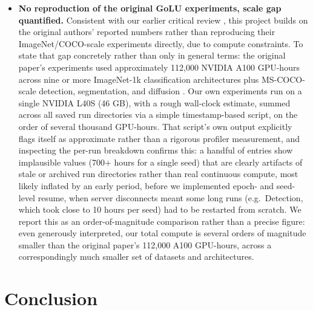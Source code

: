 \documentclass[conference]{IEEEtran}
\begin{document}
\begin{itemize}
\item \textbf{No reproduction of the original GoLU experiments, scale gap quantified.} Consistent with our earlier critical review \cite{kopic2026critical}, this project builds on the original authors' reported numbers rather than reproducing their ImageNet/COCO-scale experiments directly, due to compute constraints. To state that gap concretely rather than only in general terms: the original paper's experiments used approximately 112{,}000 NVIDIA A100 GPU-hours across nine or more ImageNet-1k classification architectures plus MS-COCO-scale detection, segmentation, and diffusion \cite{golu2025}. Our own experiments run on a single NVIDIA L40S (46 GB), with a rough wall-clock estimate, summed across all saved run directories via a simple timestamp-based script, on the order of several thousand GPU-hours. That script's own output explicitly flags itself as approximate rather than a rigorous profiler measurement, and inspecting the per-run breakdown confirms this: a handful of entries show implausible values (700+ hours for a single seed) that are clearly artifacts of stale or archived run directories rather than real continuous compute, most likely inflated by an early period, before we implemented epoch- and seed-level resume, when server disconnects meant some long runs (e.g.\ Detection, which took close to 10 hours per seed) had to be restarted from scratch. We report this as an order-of-magnitude comparison rather than a precise figure: even generously interpreted, our total compute is several orders of magnitude smaller than the original paper's 112{,}000 A100 GPU-hours, across a correspondingly much smaller set of datasets and architectures.
\end{itemize}

\section{Conclusion}
\end{document}
